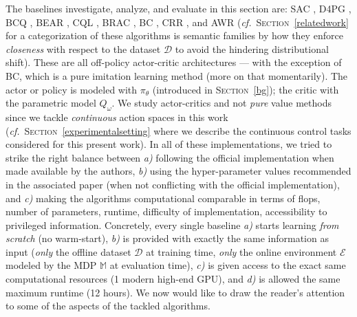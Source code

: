The baselines investigate, analyze, and evaluate in this section are:
SAC \cite{Haarnoja2018-bm},
D4PG \cite{Barth-Maron2018-ot},
BCQ \cite{Fujimoto2018-mj},
BEAR \cite{Kumar2019-rw},
CQL \cite{Kumar2020-zb},
BRAC \cite{Wu2019-nl},
BC \cite{Pomerleau1989-nh, Pomerleau1990-lm, Ratliff2007-fc, Bagnell2015-ni},
CRR \cite{Wang2020-sr}, and
AWR \cite{Peng2019-hu}
(\textit{cf.}~\textsc{Section}~\ref{relatedwork} for a categorization of these algorithms is
semantic families by how they enforce \emph{closeness} with respect to the dataset $\mathcal{D}$
to avoid the hindering distributional shift).
These are all off-policy actor-critic \cite{Sutton1984-ce, Konda2000-ef, Konda2003-jh, Degris2012-gv}
architectures --- with the exception of BC, which is a pure imitation learning \cite{Bagnell2015-ni}
method (more on that momentarily).
The actor or policy is modeled with $\pi_\theta$ (introduced in \textsc{Section}~\ref{bg});
the critic with the parametric model $Q_\omega$.
We study actor-critics and not \textit{pure} value methods
since we tackle \emph{continuous} action spaces in this work
(\textit{cf.}~\textsc{Section}~\ref{experimentalsetting} where we describe the
continuous control tasks
considered for this present work).
In all of these implementations, we tried to strike the right balance between
\textit{a)} following the official implementation when made available by the authors,
\textit{b)} using the hyper-parameter values recommended in the associated paper (when not conflicting with
the official implementation), and
\textit{c)} making the algorithms computational comparable in terms of flops, number of parameters,
runtime, difficulty of implementation, accessibility to privileged information.
Concretely, every single baseline
\textit{a)} starts learning \emph{from scratch} (no warm-start),
\textit{b)} is provided with exactly the same information as input
(\emph{only} the offline dataset $\mathcal{D}$ at training time,
\emph{only} the online environment $\mathcal{E}$ modeled by the MDP $\mathbb{M}$ at evaluation time),
\textit{c)} is given access to the exact same computational resources (1 modern high-end GPU),
and
\textit{d)} is allowed the same maximum runtime (12 hours).
We now would like to draw the reader's attention to some of the aspects of the tackled
algorithms.

